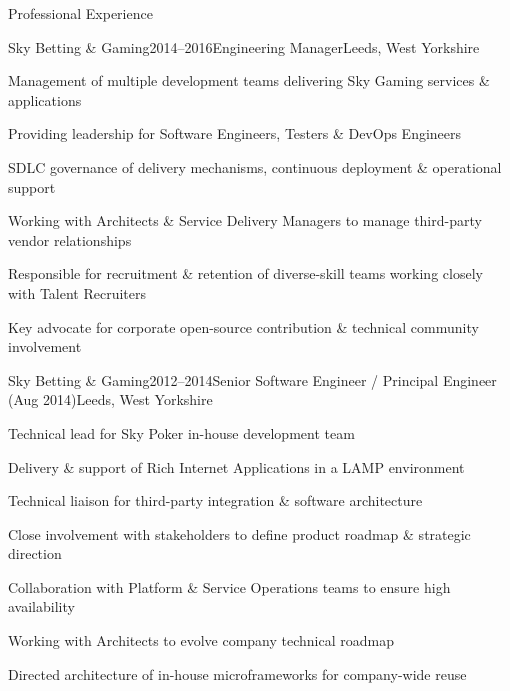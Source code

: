 \documentclass{cv}
\begin{document}
\begin{rSection}{Professional Experience}


\begin{rSubsection}{Sky Betting \& Gaming}{2014--2016}{Engineering Manager}{Leeds, West Yorkshire}
\item Management of multiple development teams delivering Sky Gaming services \& applications
\item Providing leadership for Software Engineers, Testers \& DevOps Engineers
\item SDLC governance of delivery mechanisms, continuous deployment \& operational support
\item Working with Architects \& Service Delivery Managers to manage third-party vendor relationships
\item Responsible for recruitment \& retention of diverse-skill teams working closely with Talent Recruiters
\item Key advocate for corporate open-source contribution \& technical community involvement
\end{rSubsection}


\begin{rSubsection}{Sky Betting \& Gaming}{2012--2014}{Senior Software Engineer / Principal Engineer (Aug 2014)}{Leeds, West Yorkshire}
\item Technical lead for Sky Poker in-house development team
\item Delivery \& support of Rich Internet Applications in a LAMP environment
\item Technical liaison for third-party integration \& software architecture
\item Close involvement with stakeholders to define product roadmap \& strategic direction
\item Collaboration with Platform \& Service Operations teams to ensure high availability
\item Working with Architects to evolve company technical roadmap
\item Directed architecture of in-house microframeworks for company-wide reuse
\end{rSubsection}



\end{rSection}
\end{document}
